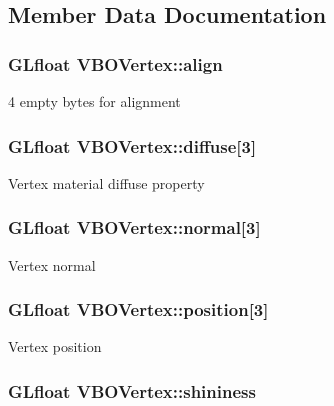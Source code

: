 \subsection{Member Data Documentation}
\hypertarget{structVBOVertex_a6b0bd5c23010ff965be5f0e363794e2e}{
\subsubsection[{align}]{\setlength{\rightskip}{0pt plus 5cm}G\-Lfloat V\-B\-O\-Vertex\-::align}}\label{structVBOVertex_a6b0bd5c23010ff965be5f0e363794e2e}
4 empty bytes for alignment \hypertarget{structVBOVertex_aab28e81480a342a61ce79b74702fccc5}{
\subsubsection[{diffuse}]{\setlength{\rightskip}{0pt plus 5cm}G\-Lfloat V\-B\-O\-Vertex\-::diffuse\mbox{[}3\mbox{]}}}\label{structVBOVertex_aab28e81480a342a61ce79b74702fccc5}
Vertex material diffuse property \hypertarget{structVBOVertex_abf03d625c89963c0b39d4d3cd59fafb2}{
\subsubsection[{normal}]{\setlength{\rightskip}{0pt plus 5cm}G\-Lfloat V\-B\-O\-Vertex\-::normal\mbox{[}3\mbox{]}}}\label{structVBOVertex_abf03d625c89963c0b39d4d3cd59fafb2}
Vertex normal \hypertarget{structVBOVertex_aa0ce514d26cbbdbfab7ffba3c5b53e2e}{
\subsubsection[{position}]{\setlength{\rightskip}{0pt plus 5cm}G\-Lfloat V\-B\-O\-Vertex\-::position\mbox{[}3\mbox{]}}}\label{structVBOVertex_aa0ce514d26cbbdbfab7ffba3c5b53e2e}
Vertex position \hypertarget{structVBOVertex_a6a650b656bade90ee41ae7dded37c7d1}{
\subsubsection[{shininess}]{\setlength{\rightskip}{0pt plus 5cm}G\-Lfloat V\-B\-O\-Vertex\-::shininess}}\label{structVBOVertex_a6a650b656bade90ee41ae7dded37c7d1}
